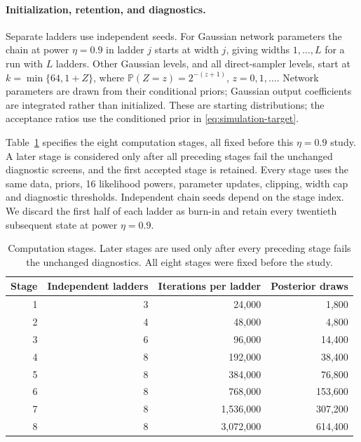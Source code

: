 \documentclass[11pt,a4paper]{article}
\theoremstyle{remark}
\newcommand{\PP}{\mathbb P}
\begin{document}
\paragraph{Initialization, retention, and diagnostics.}
Separate ladders use independent seeds. For Gaussian network parameters the
chain at power $\eta=0.9$ in ladder $j$ starts at width $j$, giving widths
$1,\ldots,L$ for a run with $L$ ladders.
Other Gaussian levels, and all direct-sampler levels, start at
$k=\min\{64,1+Z\}$, where
$\PP(Z=z)=2^{-(z+1)}$, $z=0,1,\ldots$.
Network parameters are drawn from their conditional priors;
Gaussian {output coefficients} are integrated rather than initialized.
These are starting distributions; the acceptance ratios use the
conditioned prior in \eqref{eq:simulation-target}.
\endgroup

{Table~\ref{tab:simulation-computation-stages} specifies the eight computation stages, all fixed before this $\eta=0.9$ study. A later stage is considered only after all preceding stages fail the unchanged diagnostic screens, and the first accepted stage is retained. Every stage uses the same data, priors, 16 likelihood powers, parameter updates, clipping, width cap and diagnostic thresholds. Independent chain seeds depend on the stage index. We discard the first half of each ladder as burn-in and retain every twentieth subsequent state at power $\eta=0.9$.

\begin{table}[ht]
\centering\small
\caption{Computation stages. Later stages are used only after every
preceding stage fails the unchanged diagnostics. All eight stages were fixed before the study.}
\label{tab:simulation-computation-stages}
\begin{tabular}{@{}rrrr@{}}
\toprule
Stage & Independent ladders & Iterations per ladder & Posterior draws\\
\midrule
1 & 3 & 24,000 & 1,800\\
2 & 4 & 48,000 & 4,800\\
3 & 6 & 96,000 & 14,400\\
4 & 8 & 192,000 & 38,400\\
5 & 8 & 384,000 & 76,800\\
6 & 8 & 768,000 & 153,600\\
7 & 8 & 1,536,000 & 307,200\\
8 & 8 & 3,072,000 & 614,400\\
\bottomrule
\end{tabular}
\end{table}

}
\end{document}

